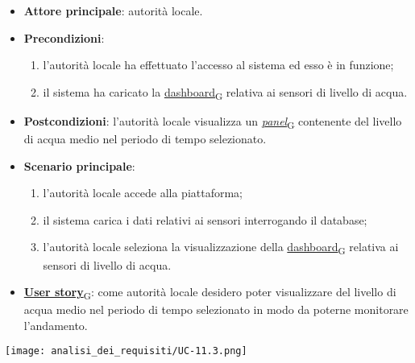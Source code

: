 \begin{itemize}
	\item \textbf{Attore principale}: autorità locale.
	\item \textbf{Precondizioni}:
	      \begin{enumerate}
		      \item l'autorità locale ha effettuato l'accesso al sistema ed esso è in funzione;
		      \item il sistema ha caricato la \href{https://7last.github.io/docs/rtb/documentazione-interna/glossario\#dashboard}{dashboard\textsubscript{G}} relativa ai sensori di livello di acqua.
	      \end{enumerate}
	\item \textbf{Postcondizioni}: l'autorità locale visualizza un \href{https://7last.github.io/docs/rtb/documentazione-interna/glossario\#panel}{\textit{panel}\textsubscript{G}} contenente del livello di acqua medio nel periodo di tempo selezionato.
	\item \textbf{Scenario principale}:
	      \begin{enumerate}
		      \item l'autorità locale accede alla piattaforma;
		      \item il sistema carica i dati relativi ai sensori interrogando il database;
		      \item l'autorità locale seleziona la visualizzazione della \href{https://7last.github.io/docs/rtb/documentazione-interna/glossario\#dashboard}{dashboard\textsubscript{G}} relativa ai sensori di livello di acqua.
	      \end{enumerate}
	\item \href{https://7last.github.io/docs/rtb/documentazione-interna/glossario\#user-story}{\textbf{User story}\textsubscript{G}}:
	      come autorità locale desidero poter visualizzare del livello di acqua medio nel periodo di tempo selezionato
	      in modo da poterne monitorare l'andamento.
\end{itemize}
\begin{center}
	\texttt{[image: analisi\_dei\_requisiti/UC-11.3.png]}
\end{center}

